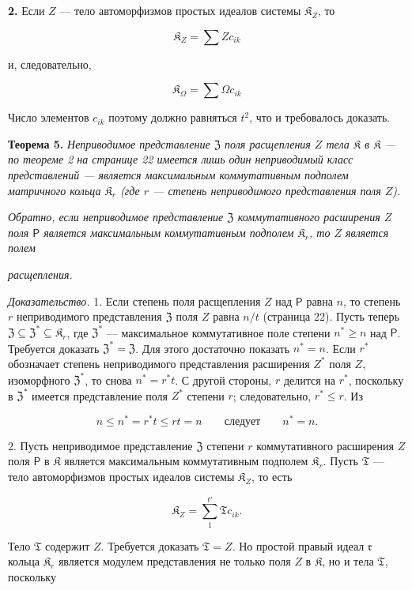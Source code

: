 \documentclass[11pt]{article}
\begin{document}
\textbf{2.} Если \(Z\) --- тело автоморфизмов простых идеалов системы \(\mathfrak K_Z\), то

\[
\mathfrak K_Z=\sum Zc_{ik}
\]

и, следовательно,

\[
\mathfrak K_\Omega=\sum\Omega c_{ik}
\]

Число элементов \(c_{ik}\) поэтому должно равняться \(t^2\), что и требовалось доказать.

\textbf{Теорема 5.} \emph{Неприводимое представление \(\mathfrak Z\) поля расщепления \(Z\) тела \(\mathfrak K\) в \(\mathfrak K\) --- по теореме 2 на странице 22 имеется лишь один неприводимый класс представлений --- является максимальным коммутативным подполем матричного кольца \(\mathfrak K_r\) (где \(r\) --- степень неприводимого представления поля \(Z\)).}

\emph{Обратно, если неприводимое представление \(\mathfrak Z\) коммутативного расширения \(Z\) поля \(\mathsf P\) является максимальным коммутативным подполем \(\mathfrak K_r\), то \(Z\) является полем}

\emph{расщепления.}

\emph{Доказательство.} 1. Если степень поля расщепления \(Z\) над \(\mathsf P\) равна \(n\), то степень \(r\) неприводимого представления \(\mathfrak Z\) поля \(Z\) равна \(n/t\) (страница 22). Пусть теперь \(\mathfrak Z\subseteq\mathfrak Z^*\subseteq\mathfrak K_r\), где \(\mathfrak Z^*\) --- максимальное коммутативное поле степени \(n^*\geq n\) над \(\mathsf P\). Требуется доказать \(\mathfrak Z^*=\mathfrak Z\). Для этого достаточно показать \(n^*=n\). Если \(r^*\) обозначает степень неприводимого представления расширения \(Z^*\) поля \(Z\), изоморфного \(\mathfrak Z^*\), то снова \(n^*=r^*t\). С другой стороны, \(r\) делится на \(r^*\), поскольку в \(\mathfrak Z^*\) имеется представление поля \(Z^*\) степени \(r\); следовательно, \(r^*\leq r\). Из

\[
n\leq n^*=r^*t\leq rt=n \qquad\text{следует}\qquad n^*=n.
\]

2. Пусть неприводимое представление \(\mathfrak Z\) степени \(r\) коммутативного расширения \(Z\) поля \(\mathsf P\) в \(\mathfrak K\) является максимальным коммутативным подполем \(\mathfrak K_r\). Пусть \(\mathfrak T\) --- тело автоморфизмов простых идеалов системы \(\mathfrak K_Z\), то есть

\[
\mathfrak K_Z=\sum_{1}^{t'}\mathfrak T c_{ik}.
\]

Тело \(\mathfrak T\) содержит \(Z\). Требуется доказать \(\mathfrak T=Z\). Но простой правый идеал \(\mathfrak r\) кольца \(\mathfrak K_r\) является модулем представления не только поля \(Z\) в \(\mathfrak K\), но и тела \(\mathfrak T\), поскольку
\end{document}
